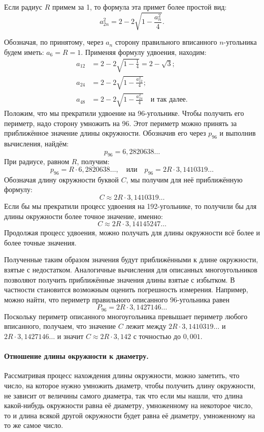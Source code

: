 \documentclass[twoside]{book}
\begin{document}
Если радиус $R$ примем за 1, то формула эта примет более простой вид:
\[a_{2n}^2=2-2\sqrt{1-\frac{a_n^2}4}.\]


Обозначая, по принятому, через $a_n$ сторону правильного вписанного $n$-угольника будем иметь:
$a_6=R=1$.
Применяя формулу удвоения, находим:
\begin{align*}
a_{12}&=2-2\sqrt{1-\tfrac14}=2-\sqrt3;
\\
a_{24}&=2-2\sqrt{1-\tfrac{a_{12}^2}{4}};
\\
a_{48}&=2-2\sqrt{1-\tfrac{a_{24}^2}{4}}\quad\text{и так далее.}
\end{align*}
Положим, что мы прекратили удвоение на 96-угольнике.
Чтобы получить его периметр, надо сторону умножить на 96.
Этот периметр можно принять за приближённое значение длины окружности.
Обозначив его через $p_{96}$ и выполнив вычисления, найдём:
\[p_{96} = 6{,}2820638\dots\]
При радиусе, равном $R$, получим:
\[p_{96}=R\cdot6{,}2820638\dots,
\quad\text{или}\quad
p_{96}=2R\cdot3{,}1410319\dots\]
Обозначая длину окружности буквой $C$, мы получим для неё приближённую формулу:
\[C\approx 2R\cdot3{,}1410319\dots\]
Если бы мы прекратили процесс удвоения на 192-угольнике, то получили бы для длины окружности более точное значение, именно:
\[C\approx2R\cdot3{,}14145247\dots\]
Продолжая процесс удвоения, можно получать для длины окружности всё более и более точные значения.

Полученные таким образом значения будут приближёнными к длине окружности, взятые с недостатком.
Аналогичные вычисления для описанных многоугольников позволяют получить приближённые значения длины взятые с избытком.
В частности становится возможным оценить погрешность измерения.
Например, можно найти, что периметр правильного описанного $96$-угольника равен
\[P_{96}=2R\cdot 3{,}1427146\dots\]
Поскольку периметр описанного многоугольника превышает периметр любого вписанного, получаем, что значение $C$ лежит между $2R\cdot3{,}1410319\dots$ и $2R\cdot 3{,}1427146\dots$ и значит $C\approx 2R\cdot3{,}142$ с точностью до $0{,}001$.


\paragraph{Отношение длины окружности к диаметру.}\label{1938/238}
Рассматривая процесс нахождения длины окружности, можно заметить, что число, на которое нужно умножить диаметр, чтобы получить длину окружности, не зависит от величины самого диаметра, так что если мы нашли, что длина какой-нибудь окружности равна её диаметру, умноженному на некоторое число, то и длина всякой другой окружности будет равна её диаметру, умноженному на то же самое число.
\end{document}
